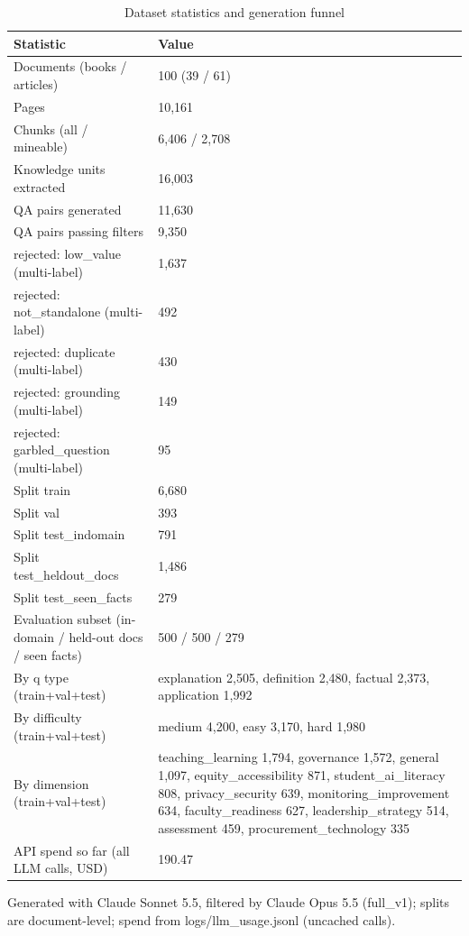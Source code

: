 \begin{table}[t]
\centering
\scriptsize
\caption{Dataset statistics and generation funnel}
\label{tab:T1_dataset}
\begin{tabular}{lp{9cm}}
\toprule
Statistic & Value \\
\midrule
Documents (books / articles) & 100 (39 / 61) \\
Pages & 10,161 \\
Chunks (all / mineable) & 6,406 / 2,708 \\
Knowledge units extracted & 16,003 \\
QA pairs generated & 11,630 \\
QA pairs passing filters & 9,350 \\
  rejected: low\_value (multi-label) & 1,637 \\
  rejected: not\_standalone (multi-label) & 492 \\
  rejected: duplicate (multi-label) & 430 \\
  rejected: grounding (multi-label) & 149 \\
  rejected: garbled\_question (multi-label) & 95 \\
Split train & 6,680 \\
Split val & 393 \\
Split test\_indomain & 791 \\
Split test\_heldout\_docs & 1,486 \\
Split test\_seen\_facts & 279 \\
Evaluation subset (in-domain / held-out docs / seen facts) & 500 / 500 / 279 \\
By q type (train+val+test) & explanation 2,505, definition 2,480, factual 2,373, application 1,992 \\
By difficulty (train+val+test) & medium 4,200, easy 3,170, hard 1,980 \\
By dimension (train+val+test) & teaching\_learning 1,794, governance 1,572, general 1,097, equity\_accessibility 871, student\_ai\_literacy 808, privacy\_security 639, monitoring\_improvement 634, faculty\_readiness 627, leadership\_strategy 514, assessment 459, procurement\_technology 335 \\
API spend so far (all LLM calls, USD) & 190.47 \\
\bottomrule
\end{tabular}
\par\smallskip\footnotesize Generated with Claude Sonnet 5.5, filtered by Claude Opus 5.5 (full\_v1); splits are document-level; spend from logs/llm\_usage.jsonl (uncached calls).
\end{table}
